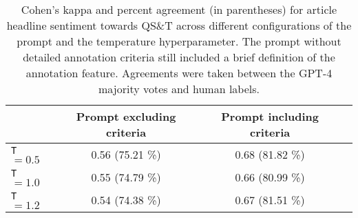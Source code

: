 
\begin{table}
    \centering
    \begin{tabular}{lccc}
        \toprule
        & \multicolumn{1}{p{4cm}}{\centering Prompt excluding criteria}
        & \multicolumn{1}{p{4cm}}{\centering Prompt including criteria} \\
        \midrule
        \texttt{T} $= 0.5$ & 0.56 (75.21 \%)
        & 0.68 (81.82 \%)
        \\
        \texttt{T} $= 1.0$ & 0.55 (74.79 \%)
        & 0.66 (80.99 \%)
        \\
        \texttt{T} $= 1.2$ & 0.54 (74.38 \%)
        & 0.67 (81.51 \%)
        \\
        \bottomrule
    \end{tabular}
    \vspace{1em}
    \caption{Cohen's kappa and percent agreement (in parentheses) for article headline sentiment towards QS\&T across different configurations of the prompt and the temperature hyperparameter. The prompt without detailed annotation criteria still included a brief definition of the annotation feature. Agreements were taken between the GPT-4 majority votes and human labels. }
    \label{tab:headline_ICRs}
\end{table}


